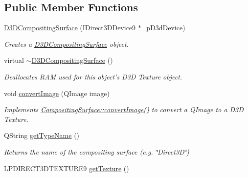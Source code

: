 \subsection*{Public Member Functions}
\begin{DoxyCompactItemize}
\item 
\hyperlink{class_picto_1_1_d3_d_compositing_surface_ad13ea262a3a1165ac6c2098a11816405}{D3\-D\-Compositing\-Surface} (I\-Direct3\-D\-Device9 $\ast$\-\_\-p\-D3d\-Device)
\begin{DoxyCompactList}\small\item\em Creates a \hyperlink{class_picto_1_1_d3_d_compositing_surface}{D3\-D\-Compositing\-Surface} object. \end{DoxyCompactList}\item 
\hypertarget{class_picto_1_1_d3_d_compositing_surface_afa0df367f0ea3500dd135968ebb174e4}{virtual \hyperlink{class_picto_1_1_d3_d_compositing_surface_afa0df367f0ea3500dd135968ebb174e4}{$\sim$\-D3\-D\-Compositing\-Surface} ()}\label{class_picto_1_1_d3_d_compositing_surface_afa0df367f0ea3500dd135968ebb174e4}

\begin{DoxyCompactList}\small\item\em Deallocates R\-A\-M used for this object's D3\-D Texture object. \end{DoxyCompactList}\item 
void \hyperlink{class_picto_1_1_d3_d_compositing_surface_a843af9d14affbb813878c5289c223782}{convert\-Image} (Q\-Image image)
\begin{DoxyCompactList}\small\item\em Implements \hyperlink{struct_picto_1_1_compositing_surface_ae19679a1e4ba977ce0e353ed841fc77e}{Compositing\-Surface\-::convert\-Image()} to convert a Q\-Image to a D3\-D Texture. \end{DoxyCompactList}\item 
\hypertarget{class_picto_1_1_d3_d_compositing_surface_a42827c980224cf6c3bd813c5efa7e7c9}{Q\-String \hyperlink{class_picto_1_1_d3_d_compositing_surface_a42827c980224cf6c3bd813c5efa7e7c9}{get\-Type\-Name} ()}\label{class_picto_1_1_d3_d_compositing_surface_a42827c980224cf6c3bd813c5efa7e7c9}

\begin{DoxyCompactList}\small\item\em Returns the name of the compositing surface (e.\-g. \char`\"{}\-Direct3\-D\char`\"{}) \end{DoxyCompactList}\item 
\hypertarget{class_picto_1_1_d3_d_compositing_surface_a18dac94238cb68b7c779bff4fe4af069}{L\-P\-D\-I\-R\-E\-C\-T3\-D\-T\-E\-X\-T\-U\-R\-E9 \hyperlink{class_picto_1_1_d3_d_compositing_surface_a18dac94238cb68b7c779bff4fe4af069}{get\-Texture} ()}\label{class_picto_1_1_d3_d_compositing_surface_a18dac94238cb68b7c779bff4fe4af069}


\end{DoxyCompactItemize}
